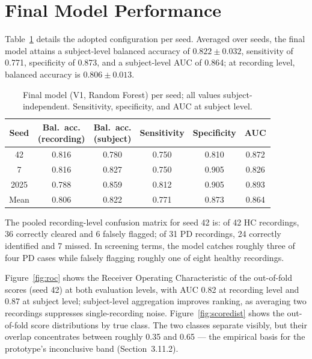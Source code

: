 \section{Final Model Performance}

Table~\ref{tab:final} details the adopted configuration per seed.
Averaged over seeds, the final model attains a subject-level balanced
accuracy of $0.822 \pm 0.032$, sensitivity of 0.771, specificity of
0.873, and a subject-level AUC of 0.864; at recording level, balanced
accuracy is $0.806 \pm 0.013$.

\begin{table}[htb]
\centering
\caption{Final model (V1, Random Forest) per seed; all values
subject-independent. Sensitivity, specificity, and AUC at subject
level.}
\label{tab:final}
\small
\begin{tabular}{cccccc}
\toprule
Seed & \makecell[c]{Bal.\ acc.\\(recording)} &
\makecell[c]{Bal.\ acc.\\(subject)} & Sensitivity & Specificity & AUC \\
\midrule
42   & 0.816 & 0.780 & 0.750 & 0.810 & 0.872 \\
7    & 0.816 & 0.827 & 0.750 & 0.905 & 0.826 \\
2025 & 0.788 & 0.859 & 0.812 & 0.905 & 0.893 \\
\midrule
Mean & 0.806 & 0.822 & 0.771 & 0.873 & 0.864 \\
\bottomrule
\end{tabular}
\end{table}

The pooled recording-level confusion matrix for seed 42 is: of 42 HC
recordings, 36 correctly cleared and 6 falsely flagged; of 31 PD
recordings, 24 correctly identified and 7 missed. In screening terms,
the model catches roughly three of four PD cases while falsely
flagging roughly one of eight healthy recordings.

Figure~\ref{fig:roc} shows the Receiver Operating Characteristic of
the out-of-fold scores (seed 42) at both evaluation levels, with AUC
0.82 at recording level and 0.87 at subject level; subject-level
aggregation improves ranking, as averaging two recordings suppresses
single-recording noise. Figure~\ref{fig:scoredist} shows the
out-of-fold score distributions by true class. The two classes
separate visibly, but their overlap concentrates between roughly 0.35
and 0.65 --- the empirical basis for the prototype's inconclusive band
(Section~3.11.2).

